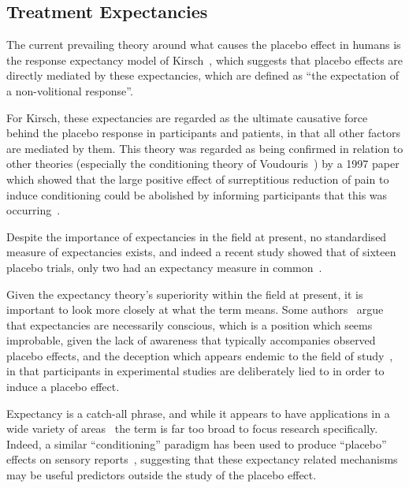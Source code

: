 \subsection{Treatment Expectancies}
\label{sec:placebo-expectancies}

The current prevailing theory around what causes the placebo effect in humans is the response expectancy model of Kirsch~\cite{Kirsch1985,Kirsch1997}, which suggests that placebo effects are directly mediated by these expectancies, which are defined as ``the expectation of a non-volitional response''.

For Kirsch, these expectancies are regarded as the ultimate causative force behind the placebo response in participants and patients, in that all other factors are mediated by them. This theory was regarded as being confirmed in relation to other theories (especially the conditioning theory of Voudouris~\cite{Voudouris1985}) by a 1997 paper which showed that the large positive effect of surreptitious reduction of pain to induce conditioning could be abolished by informing participants that this was occurring~\cite{Montgomery1997}.

Despite the importance of expectancies in the field at present, no standardised measure of expectancies exists, and indeed a recent study showed that of sixteen placebo trials, only two had an expectancy measure in common~\cite{myers2008patient}. 

Given the expectancy theory's superiority within the field at present, it is important to look more closely at what the term means. Some authors~\cite{Stewart-Williams2004a}  argue that expectancies are necessarily conscious, which is a position which seems improbable, given the lack of awareness that typically accompanies observed placebo effects, and the deception which appears endemic to the field of study~\cite{Miller2008a,Miller2008}, in that participants in experimental studies are deliberately lied to in order to induce a placebo effect. 

Expectancy is a catch-all phrase, and while it appears to have applications in a wide variety of areas~\cite{Montgomery2007} the term is far too broad to focus research specifically. Indeed, a similar ``conditioning'' paradigm has been used to produce ``placebo'' effects on sensory reports~\cite{Sterzer2008}, suggesting that these expectancy related mechanisms may be useful predictors outside the study of the placebo effect. 






